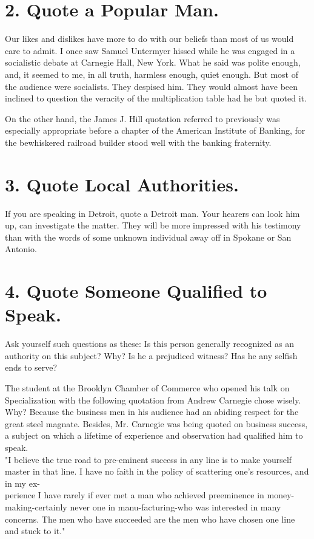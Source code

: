 \documentclass[10pt]{article}
\begin{document}
\section*{2. Quote a Popular Man.}
Our likes and dislikes have more to do with our beliefs than most of us would care to admit. I once saw Samuel Untermyer hissed while he was engaged in a socialistic debate at Carnegie Hall, New York. What he said was polite enough, and, it seemed to me, in all truth, harmless enough, quiet enough. But most of the audience were socialists. They despised him. They would almost have been\\
inclined to question the veracity of the multiplication table had he but quoted it.

On the other hand, the James J. Hill quotation referred to previously was especially appropriate before a chapter of the American Institute of Banking, for the bewhiskered railroad builder stood well with the banking fraternity.

\section*{3. Quote Local Authorities.}
If you are speaking in Detroit, quote a Detroit man. Your hearers can look him up, can investigate the matter. They will be more impressed with his testimony than with the words of some unknown individual away off in Spokane or San Antonio.

\section*{4. Quote Someone Qualified to Speak.}
Ask yourself such questions as these: Is this person generally recognized as an authority on this subject? Why? Is he a prejudiced witness? Has he any selfish ends to serve?

The student at the Brooklyn Chamber of Commerce who opened his talk on Specialization with the following quotation from Andrew Carnegie chose wisely. Why? Because the business men in his audience had an abiding respect for the great steel magnate. Besides, Mr. Carnegie was being quoted on business success, a subject on which a lifetime of experience and observation had qualified him to speak.\\
"I believe the true road to pre-eminent success in any line is to make yourself master in that line. I have no faith in the policy of scattering one's resources, and in my ex-\\
perience I have rarely if ever met a man who achieved preeminence in money-making-certainly never one in manu-facturing-who was interested in many concerns. The men who have succeeded are the men who have chosen one line and stuck to it."
\end{document}
